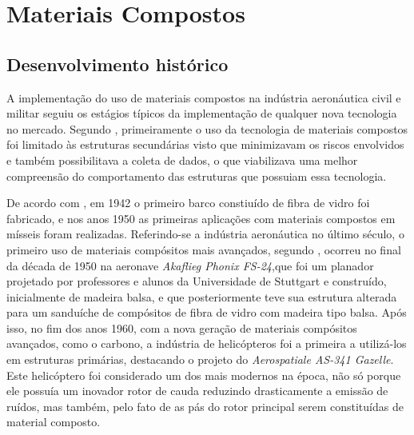 \chapter[Materiais Compostos]{Materiais Compostos}

\section{Desenvolvimento histórico}
A implementação do uso de materiais compostos na indústria aeronáutica civil e militar seguiu os estágios típicos da implementação de qualquer nova tecnologia no mercado. Segundo \cite{kassapoglou2013design}, primeiramente o uso da tecnologia de materiais compostos foi limitado às estruturas secundárias visto que minimizavam os riscos envolvidos e também possibilitava a coleta de dados, o que viabilizava uma melhor compreensão do comportamento das estruturas que possuiam essa tecnologia.

De acordo com \cite{daniel2006engineering}, em 1942 o primeiro barco constiuído de fibra de vidro foi fabricado, e nos anos 1950 as primeiras aplicações com materiais compostos em mísseis foram realizadas. Referindo-se a indústria aeronáutica no último século, o primeiro uso de materiais compósitos mais avançados, segundo \cite{kassapoglou2013design}, ocorreu no final da década de 1950 na aeronave \emph{Akaflieg Phonix FS-24},que foi um planador projetado por professores e alunos da Universidade de Stuttgart e construído, inicialmente de madeira balsa, e que posteriormente teve sua estrutura alterada para um sanduíche de compósitos de fibra de vidro com madeira tipo balsa. Após isso, no fim dos anos 1960, com a nova geração de materiais compósitos avançados, como o carbono, a indústria de helicópteros foi a primeira a utilizá-los em estruturas primárias, destacando o projeto do \emph{Aerospatiale AS-341 Gazelle}. Este helicóptero foi considerado um dos mais modernos na época, não só porque ele possuía um inovador rotor de cauda reduzindo drasticamente a emissão de ruídos, mas também, pelo fato de as pás do rotor principal serem constituídas de material composto.

